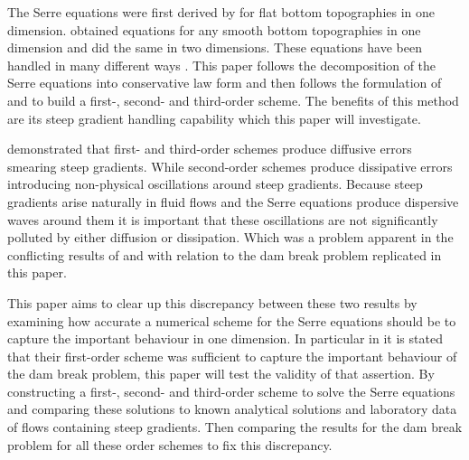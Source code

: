 \documentclass[SingleSpace,12pt]{Serre_ASCE}
\begin{document}
The Serre equations were first derived by  for flat bottom topographies in one dimension.  obtained equations for any smooth bottom topographies in one dimension and  did the same in two dimensions. These equations have been handled in many different ways \cite{Dutykh-2014-315,Bonneton-etal-2011-1479,Antunes-do-Carmo-etal-1993-725,Chazel-etal-2011-105,Barthelemy-2006-51-1217,Barthelemy-2007-53-1423,Clamond-2011-315}. This paper follows the decomposition of the Serre equations into conservative law form \cite{Hank-etal-2010-2034,Guyenne-etal-2014-169} and then follows the formulation of  and  to build a first-, second- and third-order scheme. The benefits of this method are its steep gradient handling capability which this paper will investigate.

 demonstrated that first- and third-order schemes produce diffusive errors smearing steep gradients. While second-order schemes produce dissipative errors introducing non-physical oscillations around steep gradients. Because steep gradients arise naturally in fluid flows and the Serre equations produce dispersive waves around them \cite{El-etal-2006} it is important that these oscillations are not significantly polluted by either diffusion or dissipation. Which was a problem apparent in the conflicting results of  and  with relation to the dam break problem replicated in this paper. 

This paper aims to clear up this discrepancy between these two results by examining how accurate a numerical scheme for the Serre equations should be to capture the important behaviour in one dimension. In particular in  it is stated that their first-order scheme was sufficient to capture the important behaviour of the dam break problem, this paper will test the validity of that assertion. By constructing a first-, second- and third-order scheme to solve the Serre equations and comparing these solutions to known analytical solutions and laboratory data of flows containing steep gradients. Then comparing the results for the dam break problem for all these order schemes to fix this discrepancy. 

\end{document}
